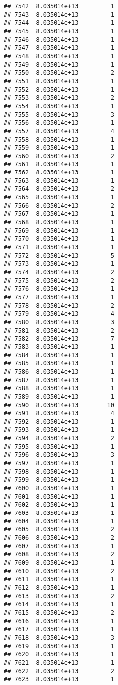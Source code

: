 \documentclass[
]{article}
\begin{document}
\begin{verbatim}
## 7542  8.035014e+13         1
## 7543  8.035014e+13         1
## 7544  8.035014e+13         1
## 7545  8.035014e+13         1
## 7546  8.035014e+13         1
## 7547  8.035014e+13         1
## 7548  8.035014e+13         1
## 7549  8.035014e+13         1
## 7550  8.035014e+13         2
## 7551  8.035014e+13         1
## 7552  8.035014e+13         1
## 7553  8.035014e+13         2
## 7554  8.035014e+13         1
## 7555  8.035014e+13         3
## 7556  8.035014e+13         1
## 7557  8.035014e+13         4
## 7558  8.035014e+13         1
## 7559  8.035014e+13         1
## 7560  8.035014e+13         2
## 7561  8.035014e+13         1
## 7562  8.035014e+13         1
## 7563  8.035014e+13         1
## 7564  8.035014e+13         2
## 7565  8.035014e+13         1
## 7566  8.035014e+13         2
## 7567  8.035014e+13         1
## 7568  8.035014e+13         1
## 7569  8.035014e+13         1
## 7570  8.035014e+13         1
## 7571  8.035014e+13         1
## 7572  8.035014e+13         5
## 7573  8.035014e+13         1
## 7574  8.035014e+13         2
## 7575  8.035014e+13         2
## 7576  8.035014e+13         1
## 7577  8.035014e+13         1
## 7578  8.035014e+13         2
## 7579  8.035014e+13         4
## 7580  8.035014e+13         3
## 7581  8.035014e+13         2
## 7582  8.035014e+13         7
## 7583  8.035014e+13         1
## 7584  8.035014e+13         1
## 7585  8.035014e+13         1
## 7586  8.035014e+13         1
## 7587  8.035014e+13         1
## 7588  8.035014e+13         1
## 7589  8.035014e+13         1
## 7590  8.035014e+13        10
## 7591  8.035014e+13         4
## 7592  8.035014e+13         1
## 7593  8.035014e+13         1
## 7594  8.035014e+13         2
## 7595  8.035014e+13         1
## 7596  8.035014e+13         3
## 7597  8.035014e+13         1
## 7598  8.035014e+13         1
## 7599  8.035014e+13         1
## 7600  8.035014e+13         1
## 7601  8.035014e+13         1
## 7602  8.035014e+13         1
## 7603  8.035014e+13         1
## 7604  8.035014e+13         1
## 7605  8.035014e+13         2
## 7606  8.035014e+13         2
## 7607  8.035014e+13         1
## 7608  8.035014e+13         2
## 7609  8.035014e+13         1
## 7610  8.035014e+13         2
## 7611  8.035014e+13         1
## 7612  8.035014e+13         1
## 7613  8.035014e+13         2
## 7614  8.035014e+13         1
## 7615  8.035014e+13         2
## 7616  8.035014e+13         1
## 7617  8.035014e+13         1
## 7618  8.035014e+13         3
## 7619  8.035014e+13         1
## 7620  8.035014e+13         1
## 7621  8.035014e+13         1
## 7622  8.035014e+13         2
## 7623  8.035014e+13         1

\end{verbatim}
\end{document}
